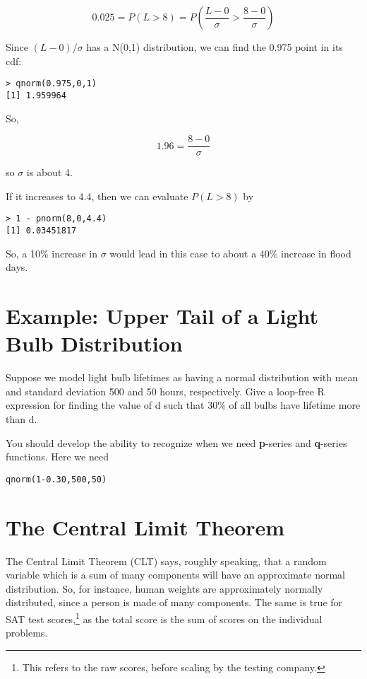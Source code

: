 \begin{equation}
0.025 = P(L > 8) = P \left ( \frac{L-0}{\sigma} > \frac{8-0}{\sigma}
\right )
\end{equation}

Since $(L-0)/\sigma$ has a N(0,1) distribution, we can find the 0.975
point in its cdf:

\begin{lstlisting}
> qnorm(0.975,0,1)
[1] 1.959964
\end{lstlisting}

So,

\begin{equation}
1.96 =  \frac{8-0}{\sigma}
\end{equation}

so $\sigma$ is about 4.

If it increases to 4.4, then we can evaluate $P(L > 8)$ by

\begin{lstlisting}
> 1 - pnorm(8,0,4.4)
[1] 0.03451817
\end{lstlisting}

So, a 10\% increase in $\sigma$ would lead in this case to about a 40\%
increase in flood days.

\section{Example:  Upper Tail of a Light Bulb Distribution}

Suppose we model light bulb lifetimes as having a normal
distribution with mean and standard deviation 500 and 50 hours,
respectively.  Give a loop-free R expression for finding the value of d
such that 30\% of all bulbs have lifetime more than d.

You should develop the ability to recognize when we need {\bf p}-series
and {\bf q}-series functions.  Here we need

\begin{lstlisting}
qnorm(1-0.30,500,50)
\end{lstlisting}

\section{The Central Limit Theorem}
\label{theclt}

The Central Limit Theorem (CLT) says, roughly speaking, that a random
variable which is a sum of many components will have an approximate
normal distribution.  So, for instance, human weights are approximately
normally distributed, since a person is made of many components.  The
same is true for SAT test scores,\footnote{This refers to the raw
scores, before scaling by the testing company.} as the total score is
the sum of scores on the individual problems.

